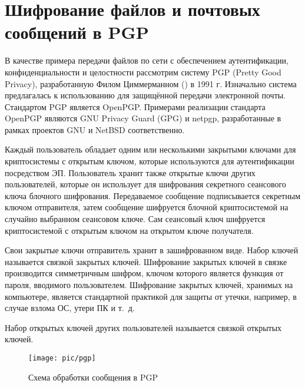 \section{Шифрование файлов и почтовых сообщений в PGP}

В качестве примера передачи файлов по сети с обеспечением аутентификации, конфиденциальности и целостности рассмотрим систему PGP (Pretty Good Privacy), разработанную Филом Циммерманном () в 1991 г. Изначально система предлагалась к использованию для защищённой передачи электронной почты. Стандартом PGP является OpenPGP. Примерами реализации стандарта OpenPGP являются GNU Privacy Guard (GPG) и netpgp, разработанные в рамках проектов GNU и NetBSD соответственно.

Каждый пользователь обладает одним или несколькими закрытыми ключами для криптосистемы с открытым ключом, которые используются для аутентификации посредством ЭП. Пользователь хранит также открытые ключи других пользователей, которые он использует для шифрования секретного сеансового ключа блочного шифрования. Передаваемое сообщение подписывается секретным ключом отправителя, затем сообщение шифруется блочной криптосистемой на случайно выбранном сеансовом ключе. Сам сеансовый ключ шифруется криптосистемой с открытым ключом на открытом ключе получателя.

Свои закрытые ключи отправитель хранит в зашифрованном виде. Набор ключей называется связкой закрытых ключей. Шифрование закрытых ключей в связке производится симметричным шифром, ключом которого является функция от пароля, вводимого пользователем. Шифрование закрытых ключей, хранимых на компьютере, является стандартной практикой для защиты от утечки, например, в случае взлома ОС, утери ПК и т.~д.

Набор открытых ключей других пользователей называется связкой открытых ключей.

\begin{figure}[!ht]
	\centering
	\texttt{[image: pic/pgp]}
	\caption{Схема обработки сообщения в PGP\label{fig:pgp}}
\end{figure}

